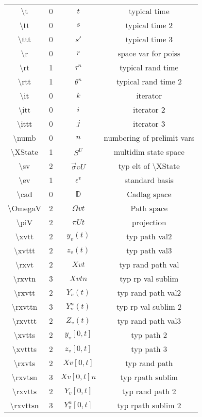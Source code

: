 \documentclass[12pt]{article}
\newcommand{\mb}{\mathbb}
\newcommand{\ep}{\epsilon}
\newcommand{\tbs}{\textbackslash}
\newcommand{\cad}{\mb{D}}							%
\renewcommand{\v}{v}							%
\renewcommand{\U}{U}							%
\renewcommand{\S}{S}							%
\newcommand{\s}{\sigma}							%
\newcommand{\sv}{\vec{\s}}						%
\newcommand{\ev}[1]{\ep^{#1}}					%
\renewcommand{\t}{t}							%
\newcommand{\proj}{\pi}							%
\renewcommand{\tt}{s}							%
\newcommand{\ttt}{s'}							%
\newcommand{\X}{X}								%
\renewcommand{\r}{r}								%
\newcommand{\rt}[1]{\tau^{#1}}						%
\newcommand{\rtt}[1]{\theta^{#1}}					%
\renewcommand{\it}{k}								%
\newcommand{\itt}{i}								%
\newcommand{\ittt}{j}								%
\newcommand{\XState}[1]{\S^{#1}}				%
\newcommand{\xvtt}[2]{y_{#1}{(#2)}}					%
\newcommand{\xvttt}[2]{z_{#1}{(#2)}}				%
\newcommand{\rxvtt}[2]{Y_{#1}{(#2)}}				%
\newcommand{\rxvttn}[3]{Y_{#1}^{#3}(#2)}			%
\newcommand{\rxvttt}[2]{Z_{#1}{(#2)}}				%
\newcommand{\xvtts}[2]{y_{#1}{#2}}					%
\newcommand{\xvttts}[2]{z_{#1}{#2}}					%
\newcommand{\rxvtts}[2]{Y_{#1}{#2}}					%
\newcommand{\rxvttsn}[3]{Y_{#1}^{#3}{#2}}			%
\begin{document}
\begin{longtable}{c|c|c|c}
\tbs t&0&\(\t\)								&typical time\\
\tbs tt&0&\(\tt\)								&typical time 2\\
\tbs ttt&0&\(\ttt\)							&typical time 3\\
\tbs r&0&\(\r\)								&space var for poiss\\
\tbs rt&1&\(\rt{n}\)					&typical rand time\\
\tbs rtt&1&\(\rtt{n}\)					&typical rand time 2\\
\tbs it&0& \(\it\)							&iterator\\
\tbs itt&0&\(\itt\)							&iterator 2\\
\tbs ittt&0&\(\ittt\)						&iterator 3\\
\tbs numb&0&\(n\)						&numbering of prelimit vars\\
\tbs XState&1&\(\XState{\U}\)				&multidim state space\\
\tbs sv&2&\(\sv{\v}{\U}\)					&typ elt of \tbs XState\\
\tbs ev&1&\(\ev{\v}\)						&standard basis\\
\tbs cad&0&\(\cad\)							&Cadlag space\\
\tbs OmegaV&2&\(\Omega{\v}{\t}\)			&Path space\\
\tbs piV&2&\(\proj{\U}{t}\)					&projection\\
\tbs xvtt&2&\(\xvtt{\v}{\t}\)					&typ path val2\\
\tbs xvttt&2&\(\xvttt{\v}{\t}\)				&typ path val3\\
\tbs rxvt&2&\(\X{\v}{\t}\)					&typ rand path val\\
\tbs rxvtn&3&\(\X{\v}{\t}{n}\)		&typ rp val sublim\\
\tbs rxvtt&2&\(\rxvtt{\v}{\t}\)				&typ rand path val2\\
\tbs rxvttn&3&\(\rxvttn{\v}{\t}{n}\)		&typ rp val sublim 2\\
\tbs rxvttt&2&\(\rxvttt{\v}{\t}\)				&typ rand path val3\\
\tbs xvtts&2&\(\xvtts{\v}{[0,\t]}\)					&typ path 2\\
\tbs xvttts&2&\(\xvttts{\v}{[0,\t]}\)					&typ path 3\\
\tbs rxvts&2&\(\X{\v}{[0,\t]}\)					&typ rand path\\
\tbs rxvtsn&3&\(\X{\v}{[0,\t]}{n}\)	&typ rpath sublim\\
\tbs rxvtts&2&\(\rxvtts{\v}{[0,\t]}\)					&typ rand path 2\\
\tbs rxvttsn&3&\(\rxvttsn{\v}{[0,\t]}{n}\)	&typ rpath sublim 2\\

\end{longtable}
\end{document}
